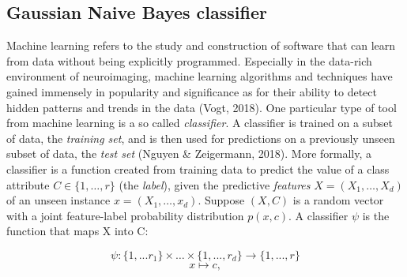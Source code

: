 \documentclass[a4paper, 12pt]{scrreprt}
\begin{document}
\subsection{Gaussian Naive Bayes classifier}
Machine learning refers to the study and construction of software that can learn from data without being explicitly programmed. Especially in the data-rich environment of neuroimaging, machine learning algorithms and techniques have gained immensely in popularity and significance as for their ability to detect hidden patterns and trends in the data (Vogt, 2018). One particular type of tool from machine learning is a so called \textit{classifier}. A classifier is trained on a subset of data, the \textit{training set}, and is then used for predictions on a previously unseen subset of data, the \textit{test set} (Nguyen \& Zeigermann, 2018). \newline
More formally, a classifier is a function created from training data to predict the value of a class attribute $C \in \{1, \ldots, r\}$ (the \textit{label}), given the predictive \textit{features} $X = (X_1, \ldots, X_d)$ of an unseen instance $x = (X_1, \ldots, x_d)$. Suppose $(X, C)$ is a random vector with a joint feature-label probability distribution $p(x, c)$. A classifier $\psi$ is the function that maps X into C:

\begin{equation}\label{classifier}
\psi: \{1, ... r_1\} \times  \ldots \times \{1, ..., r_d\} \rightarrow \{1, ..., r\}
\end{equation}
\begin{equation}
x \mapsto c,
\end{equation}
\end{document}
